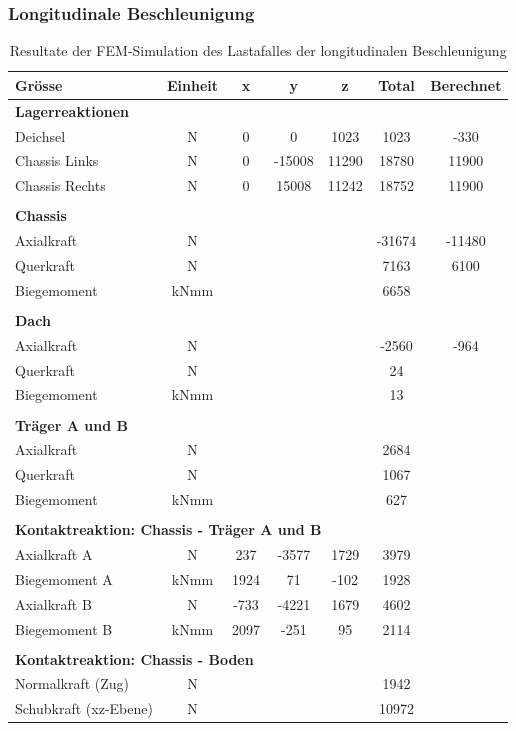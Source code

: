 \subsubsection{Longitudinale Beschleunigung}
\begin{table}[H]
\centering
\begin{tabular}{lcccccc}
Grösse	&	Einheit	&	x	&	y	&	z	&	Total	&	Berechnet	\\	\hline
\multicolumn{5}{l}{\textbf{Lagerreaktionen}}									&		&		\\	\thickhline
Deichsel	&	N	&	0	&	0	&	1023	&	1023	&	-330	\\
Chassis Links	&	N	&	0	&	-15008	&	11290	&	18780	&	11900	\\
Chassis Rechts	&	N	&	0	&	15008	&	11242	&	18752	&	11900	\\	\hline	\\
\multicolumn{5}{l}{\textbf{Chassis}}									&		&		\\	\thickhline
Axialkraft	&	N	&		&		&		&	-31674	&	-11480	\\
Querkraft	&	N	&		&		&		&	7163	&	6100	\footnotemark \\
Biegemoment	&	kNmm	&		&		&		&	6658	&		\\	\hline	\\
\multicolumn{5}{l}{\textbf{Dach}}									&		&		\\	\thickhline
Axialkraft	&	N	&		&		&		&	-2560	&	-964	\\
Querkraft	&	N	&		&		&		&	24	&		\\
Biegemoment	&	kNmm	&		&		&		&	13	&		\\	\hline	\\
\multicolumn{5}{l}{\textbf{Träger A und B}}													\\	\thickhline
Axialkraft	&	N	&		&		&		&	2684	&		\\
Querkraft	&	N	&		&		&		&	1067	&		\\
Biegemoment	&	kNmm	&		&		&		&	627	&		\\	\hline	\\
\multicolumn{5}{l}{\textbf{Kontaktreaktion: Chassis - Träger A und B}}									&		&		\\	\thickhline
 Axialkraft A	&	N	&	237	&	-3577	&	1729	&	3979	&		\\
Biegemoment A	&	kNmm	&	1924	&	71	&	-102	&	1928	&		\\
Axialkraft B	&	N	&	-733	&	-4221	&	1679	&	4602	&		\\
Biegemoment B	&	kNmm	&	2097	&	-251	&	95	&	2114	&		\\	\hline	\\
\multicolumn{5}{l}{\textbf{Kontaktreaktion: Chassis - Boden}}									&		&		\\	\thickhline
Normalkraft (Zug)	&	N	&		&		&		&	1942	&		\\
Schubkraft (xz-Ebene)	&	N	&		&		&		&	10972	&		\\	\hline
\end{tabular}
\caption{Resultate der FEM-Simulation des Lastafalles der longitudinalen Beschleunigung}
\label{tab:FEM 1.4}
\end{table}
